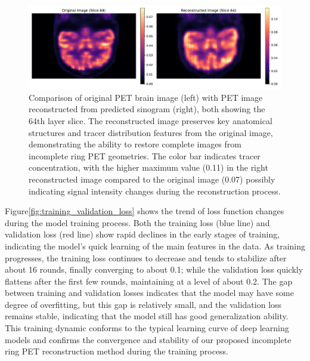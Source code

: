\documentclass[
reprint,
superscriptaddress,
nofootinbib,
amsmath,amssymb,
aps,
prd,
]{revtex4-2}
\begin{document}
\begin{figure}[ht]
    \centering
    \includegraphics[width=\textwidth]{Images/compare_reconstruction_restoration}
    \vspace{-1cm}
    \caption{Comparison of original PET brain image (left) with PET image reconstructed from predicted sinogram (right), both showing the 64th layer slice. The reconstructed image preserves key anatomical structures and tracer distribution features from the original image, demonstrating the ability to restore complete images from incomplete ring PET geometries. The color bar indicates tracer concentration, with the higher maximum value (0.11) in the right reconstructed image compared to the original image (0.07) possibly indicating signal intensity changes during the reconstruction process.}
    \label{fig:pet_brain_reconstruction}
\end{figure}

Figure\ref{fig:training_validation_loss} shows the trend of loss function changes during the model training process. Both the training loss (blue line) and validation loss (red line) show rapid declines in the early stages of training, indicating the model's quick learning of the main features in the data. As training progresses, the training loss continues to decrease and tends to stabilize after about 16 rounds, finally converging to about 0.1; while the validation loss quickly flattens after the first few rounds, maintaining at a level of about 0.2. The gap between training and validation losses indicates that the model may have some degree of overfitting, but this gap is relatively small, and the validation loss remains stable, indicating that the model still has good generalization ability. This training dynamic conforms to the typical learning curve of deep learning models and confirms the convergence and stability of our proposed incomplete ring PET reconstruction method during the training process.
\end{document}
